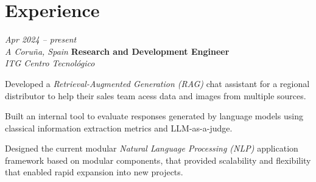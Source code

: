 \section{Experience}

\begin{twocolentry}{
\textit{Apr 2024 – present} \\
\textit{A Coruña, Spain}}
\textbf{Research and Development Engineer} \\
\hspace*{2em}\textit{ITG Centro Tecnológico}
\end{twocolentry}

\vspace{0.2 cm}
\begin{onecolentry}
\begin{highlights}
    \item Developed a \textit{Retrieval-Augmented Generation (RAG)} chat assistant for a regional distributor to help their sales team acess data and images from multiple sources.
    \item Built an internal tool to evaluate responses generated by language models using classical information extraction metrics and LLM-as-a-judge.
    \item Designed the current modular \textit{Natural Language Processing (NLP)} application framework based on modular components, that provided scalability and flexibility that enabled rapid expansion into new projects.
\end{highlights}
\end{onecolentry}